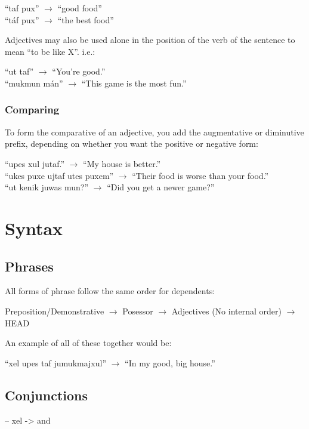 \documentclass{book}
\begin{document}
\begin{center}
    ``taf pux'' $\rightarrow$ ``good food'' \\
    ``táf pux'' $\rightarrow$ ``the best food''
\end{center}

Adjectives may also be used alone in the position of the verb of the sentence to mean ``to be like X''. i.e.:

\begin{center}
    ``ut taf'' $\rightarrow$ ``You're good.'' \\
    ``mukmun mán'' $\rightarrow$ ``This game is the most fun.''
\end{center}

\subsection{Comparing}
To form the comparative of an adjective, you add the augmentative or diminutive prefix, depending
on whether you want the positive or negative form:

\begin{center}
    ``upes xul jutaf.'' $\rightarrow$ ``My house is better.'' \\
    ``ukes puxe ujtaf utes puxem'' $\rightarrow$ ``Their food is worse than your food.'' \\
    ``ut kenik juwas mun?'' $\rightarrow$ ``Did you get a newer game?''
\end{center}


\chapter{Syntax}
\section{Phrases}
All forms of phrase follow the same order for dependents:

\begin{center}
    Preposition/Demonstrative $\rightarrow$ Posessor $\rightarrow$ Adjectives (No internal order) $\rightarrow$ HEAD
\end{center}

An example of all of these together would be:

\begin{center}
    ``xel upes taf jumukmajxul'' $\rightarrow$ ``In my good, big house.''
\end{center}

\section{Conjunctions}
-- xel -> and
\end{document}
